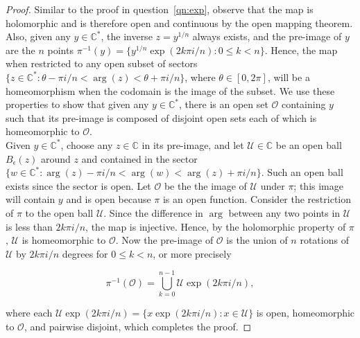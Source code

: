 \documentclass{article}
\begin{document}
\begin{enumerate}
\begin{enumerate}
\begin{enumerate}
            \begin{proof}
              Similar to the proof in question~\ref{qn:exp}, observe that
              the map is holomorphic and is therefore open and continuous
              by the open mapping theorem. Also, given any
              $y\in\mathbb{C}^*$, the inverse $z=y^{1/n}$ always exists,
              and the pre-image of $y$ are the $n$ points
              $\pi^{-1}(y)=\{y^{1/n}\exp(2k\pi i/n):0\leq k<n\}$. Hence,
              the map when restricted to any open subset of sectors
              $\{z\in\mathbb{C}^*:\theta-\pi i/n<\arg(z)<\theta+\pi i/n\}$,
              where $\theta\in[0,2\pi]$, will be a homeomorphism when the
              codomain is the image of the subset. We use these properties
              to show that given any $y\in\mathbb{C}^*$, there is an open
              set $\mathcal{O}$ containing $y$ such that its pre-image is
              composed of disjoint open sets each of which is homeomorphic
              to $\mathcal{O}$. \\

              Given $y\in\mathbb{C}^*$, choose any $z\in\mathbb{C}$ in
              its pre-image, and let $\mathcal{U}\in\mathbb{C}$ be an open
              ball $B_\epsilon(z)$ around $z$ and contained in the sector
              $\{w\in\mathbb{C}^*:\arg(z)-\pi i/n<\arg(w)<\arg(z)+\pi
              i/n\}$. Such an open ball exists since the sector is open.
              Let $\mathcal{O}$ be the the image of $\mathcal{U}$ under
              $\pi$; this image will contain $y$ and is open because $\pi$
              is an open function. Consider the restriction of $\pi$ to the
              open ball $\mathcal{U}$. Since the difference in $\arg$
              between any two points in $\mathcal{U}$ is less than $2k\pi
              i/n$, the map is injective. Hence, by the holomorphic
              property of $\pi$, $\mathcal{U}$ is homeomorphic to
              $\mathcal{O}$. Now the pre-image of $\mathcal{O}$ is the
              union of $n$ rotations of $\mathcal{U}$ by $2k\pi i/n$
              degrees for $0\leq k<n$, or more precisely

              \begin{equation*}
                \pi^{-1}(\mathcal{O}) = \bigcup\limits_{k=0}^{n-1}
                \mathcal{U}\exp(2k\pi i/n),
              \end{equation*}

              where each $\mathcal{U}\exp(2k\pi i/n)=\{x\exp(2k\pi
              i/n):x\in\mathcal{U}\}$ is open, homeomorphic to
              $\mathcal{O}$, and pairwise disjoint, which completes
              the proof.
            \end{proof}
        \end{enumerate}


\end{enumerate}
\end{enumerate}
\end{document}
